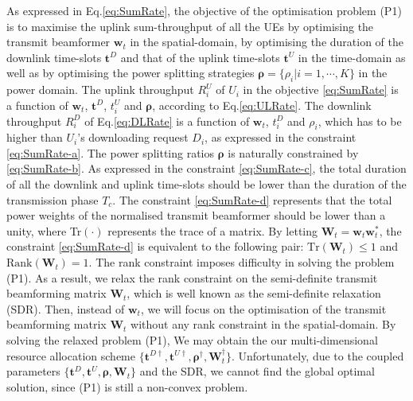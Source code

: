 \documentclass[12pt,draft,onecolumn,journal]{IEEEtran}
\begin{document}
As expressed in Eq.\eqref{eq:SumRate}, the objective of the optimisation problem (P1) is to maximise the uplink sum-throughput of all the UEs by optimising the transmit beamformer $\mathbf{w}_t$ in the spatial-domain, by optimising the duration of the downlink time-slots $\mathbf{t}^D$ and that of the uplink time-slots $\mathbf{t}^U$ in the time-domain as well as by optimising the power splitting strategies $\boldsymbol{\rho} = \{\rho_i | i = 1,\cdots, K\}$ in the power domain. The uplink throughput $R_i^U$ of $U_i$ in the objective \eqref{eq:SumRate} is a function of $\mathbf{w}_t$, $\mathbf{t}^D$, $t_i^U$ and $\boldsymbol{\rho}$, according to Eq.\eqref{eq:ULRate}. The downlink throughput $R_i^D$ of Eq.\eqref{eq:DLRate} is a function of $\mathbf{w}_t$, $t_i^D$ and $\rho_i$, which has to be higher than $U_i$'s downloading request $D_i$, as expressed in the constraint \eqref{eq:SumRate-a}. The power splitting ratios $\boldsymbol{\rho}$ is naturally constrained by \eqref{eq:SumRate-b}. As expressed in the constraint \eqref{eq:SumRate-c}, the total duration of all the downlink and uplink time-slots should be lower than the duration of the transmission phase $T_c$. The constraint \eqref{eq:SumRate-d} represents that the total power weights of the normalised transmit beamformer should be lower than a unity, where Tr$(\cdot)$ represents the trace of a matrix. By letting $\mathbf{W}_t = \mathbf{w}_t\mathbf{w}_t^*$, the constraint \eqref{eq:SumRate-d} is equivalent to the following pair: $\text{Tr}(\mathbf{W}_t) \leq 1$ and $\text{Rank}(\mathbf{W}_t) = 1$. The rank constraint imposes difficulty in solving the problem (P1). As a result, we relax the rank constraint on the semi-definite transmit beamforming matrix $\mathbf{W}_t$, which is well known as the semi-definite relaxation (SDR). Then, instead of $\mathbf{w}_t$, we will focus on the optimisation of the transmit beamforming matrix $\mathbf{W}_t$ without any rank constraint in the spatial-domain. By solving the relaxed problem (P1), We may obtain the our multi-dimensional resource allocation scheme $\{\mathbf{t}^{D\dagger}, \mathbf{t}^{U\dagger}, \boldsymbol{\rho}^\dagger, \mathbf{W}_t^\dagger\}$. Unfortunately, due to the coupled parameters $\{\mathbf{t}^{D}, \mathbf{t}^{U}, \boldsymbol{\rho}, \mathbf{W}_t\}$ and the SDR, we cannot find the global optimal solution, since (P1) is still a non-convex problem.
\end{document}
